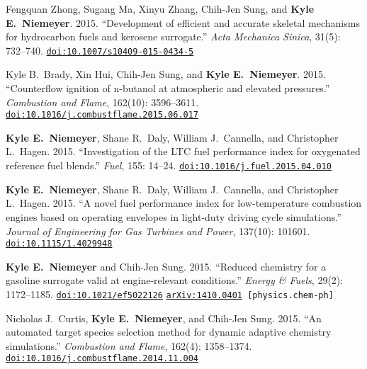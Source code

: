 \documentclass[margin,line,11pt]{res}
\makeatletter
\newlength{\bibhang}
\newlength{\bibsep}
 {\@listi \global\bibsep\itemsep \global\advance\bibsep by\parsep}
\newenvironment{bibenum*}
  {\renewcommand\labelenumi{\theenumi.}%
   \etaremune[
     topsep=0pt,
     itemsep=\bibsep,
     parsep=0pt,partopsep=0pt,
     itemindent=-\bibhang,
     leftmargin={\bibhang+\widthof{[999]}}]}
  {\endetaremune}
\newcommand*{\doi}[1]{\href{http://dx.doi.org/#1}{\nolinkurl{doi:#1}}}
\makeatother
\begin{document}
\begin{resume}
\begin{bibenum*}


\item Fengquan Zhong, Sugang Ma, Xinyu Zhang, Chih-Jen Sung, and \textbf{Kyle E.\ Niemeyer}.
2015.
``Development of efficient and accurate skeletal mechanisms for hydrocarbon fuels and kerosene surrogate.''
\emph{Acta Mechanica Sinica}, 31(5): 732--740.
\doi{10.1007/s10409-015-0434-5}

\item Kyle B.~Brady, Xin Hui, Chih-Jen Sung, and \textbf{Kyle E.~Niemeyer}. 
2015.
``Counterflow ignition of n-butanol at atmospheric and elevated pressures.''
\emph{Combustion and Flame}, 162(10): 3596--3611.
\doi{10.1016/j.combustflame.2015.06.017}

\item \textbf{Kyle E.~Niemeyer}, Shane R.~Daly, William J.~Cannella, and Christopher L.~Hagen. 
2015.
``Investigation of the LTC fuel performance index for oxygenated reference fuel blends.''
\emph{Fuel}, 155: 14--24.
\doi{10.1016/j.fuel.2015.04.010}

\item \textbf{Kyle E.\ Niemeyer}, Shane R.\ Daly, William J.\ Cannella, and Christopher L.\ Hagen.
2015.
``A novel fuel performance index for low-temperature combustion engines based on operating envelopes in light-duty driving cycle simulations.''
\emph{Journal of Engineering for Gas Turbines and Power}, 137(10): 101601.
\doi{10.1115/1.4029948}

\item \textbf{Kyle E.\ Niemeyer} and Chih-Jen Sung.
2015.
``Reduced chemistry for a gasoline surrogate valid at engine-relevant conditions.''
\emph{Energy \& Fuels}, 29(2): 1172--1185.
\doi{10.1021/ef5022126}
{\tt \href{http://arxiv.org/abs/1410.0401}{arXiv:1410.0401} [physics.chem-ph]}

\item Nicholas J.\ Curtis, \textbf{Kyle E.\ Niemeyer}, and Chih-Jen Sung.
2015.
``An automated target species selection method for dynamic adaptive chemistry simulations.''
\emph{Combustion and Flame}, 162(4): 1358--1374.
\doi{10.1016/j.combustflame.2014.11.004}


\end{bibenum*}
\end{resume}
\end{document}
